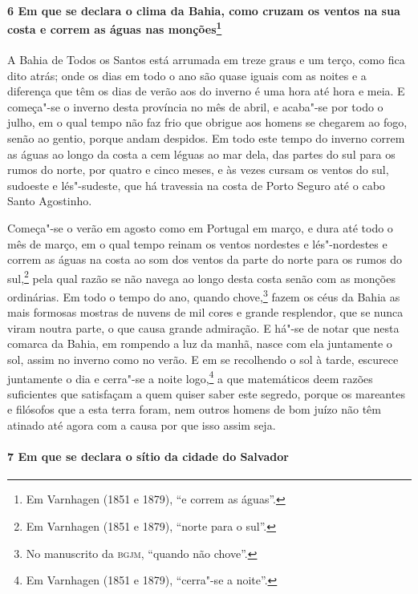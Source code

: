 \paragraph{6 Em que se declara o clima da Bahia, como cruzam os ventos na sua costa e
correm as águas nas monções\protect\footnote{ Em Varnhagen (1851 e 1879), ``e correm as
águas''.}}

A Bahia de Todos os Santos está arrumada em treze graus e um terço, como fica dito atrás;
onde os dias em todo o ano são quase iguais com as noites e a diferença que têm os dias de
verão aos do inverno é uma hora até hora e meia. E começa"-se o inverno desta província no
mês de abril, e acaba"-se por todo o julho, em o qual tempo não faz frio que obrigue aos
homens se chegarem ao fogo, senão ao gentio, porque andam despidos. Em todo este tempo do
inverno correm as águas ao longo da costa a cem léguas ao mar dela, das partes do sul para
os rumos do norte, por quatro e cinco meses, e às vezes cursam os ventos do sul, sudoeste
e lés"-sudeste, que há travessia na costa de Porto Seguro até o cabo Santo Agostinho.

Começa"-se o verão em agosto como em Portugal em março, e dura até todo o mês de março, em
o qual tempo reinam os ventos nordestes e lés"-nordestes e correm as águas na costa ao som
dos ventos da parte do norte para os rumos do sul,\footnote{ Em Varnhagen (1851 e 1879),
``norte para o sul''.} pela qual razão se não navega ao longo desta costa senão com as
monções ordinárias. Em todo o tempo do ano, quando chove,\footnote{ No manuscrito da
\textsc{bgjm}, ``quando não chove''.} fazem os céus da Bahia as mais formosas mostras de
nuvens de mil cores e grande resplendor, que se nunca viram noutra parte, o que causa
grande admiração. E há"-se de notar que nesta comarca da Bahia, em rompendo a luz da manhã,
nasce com ela juntamente o sol, assim no inverno como no verão. E em se recolhendo o sol à
tarde, escurece juntamente o dia e cerra"-se a noite logo,\footnote{ Em Varnhagen (1851 e
1879), ``cerra"-se a noite''.} a que matemáticos deem razões suficientes que satisfaçam a
quem quiser saber este segredo, porque os mareantes e filósofos que a esta terra foram,
nem outros homens de bom juízo não têm atinado até agora com a causa por que isso assim
seja.

\paragraph{7 Em que se declara o sítio da cidade do Salvador}


